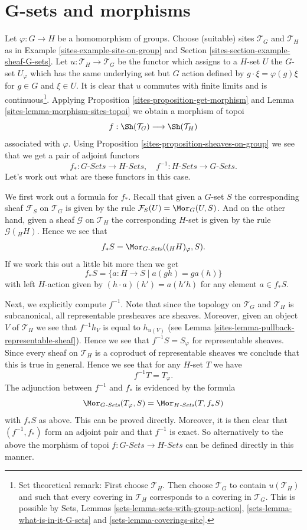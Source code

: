 \section{G-sets and morphisms}
\label{sites-section-G-sets-morphisms}
Let $\varphi : G \to H$ be a homomorphism of groups.
Choose (suitable) sites $\mathcal{T}_G$ and $\mathcal{T}_H$ as in
Example \ref{sites-example-site-on-group} and
Section \ref{sites-section-example-sheaf-G-sets}.
Let $u : \mathcal{T}_H \to \mathcal{T}_G$ be the functor which assigns
to a $H$-set $U$ the $G$-set $U_\varphi$ which has the same underlying
set but $G$ action defined by $g \cdot \xi = \varphi(g)\xi$ for
$g \in G$ and $\xi \in U$.
It is clear that $u$ commutes with finite limits and is
continuous\footnote{Set theoretical remark: First choose $\mathcal{T}_H$.
Then choose $\mathcal{T}_G$ to contain $u(\mathcal{T}_H)$ and such that
every covering in $\mathcal{T}_H$ corresponds to a covering in
$\mathcal{T}_G$. This is possible by
Sets, Lemmas
\ref{sets-lemma-sets-with-group-action},
\ref{sets-lemma-what-is-in-it-G-sets} and
\ref{sets-lemma-coverings-site}.}.
Applying
Proposition \ref{sites-proposition-get-morphism}
and
Lemma \ref{sites-lemma-morphism-sites-topoi}
we obtain a morphism of topoi
$$
f : \Sh(\mathcal{T}_G) \longrightarrow \Sh(\mathcal{T}_H)
$$
associated with $\varphi$. Using
Proposition \ref{sites-proposition-sheaves-on-group}
we see that we get a pair of adjoint functors
$$
f_* : G\textit{-Sets} \longrightarrow H\textit{-Sets}, \quad
f^{-1} : H\textit{-Sets} \longrightarrow G\textit{-Sets}.
$$
Let's work out what are these functors in this case.

\medskip\noindent
We first work out a formula for $f_*$.
Recall that given a $G$-set $S$ the corresponding sheaf
$\mathcal{F}_S$ on $\mathcal{T}_G$ is given by the rule
$\mathcal{F}_S(U) = \Mor_G(U, S)$. And on the other hand, given
a sheaf $\mathcal{G}$ on $\mathcal{T}_H$ the corresponding $H$-set
is given by the rule $\mathcal{G}({}_HH)$. Hence we see that
$$
f_*S = \Mor_{G\textit{-Sets}}(({}_HH)_\varphi, S).
$$
If we work this out a little bit more then we get
$$
f_*S = \{ a : H \to S \mid a(gh) = ga(h) \}
$$
with left $H$-action given by
$(h \cdot a)(h') = a(h'h)$
for any element $a \in f_*S$.

\medskip\noindent
Next, we explicitly compute $f^{-1}$. Note that since the topology
on $\mathcal{T}_G$ and $\mathcal{T}_H$ is subcanonical, all representable
presheaves are sheaves. Moreover, given an object $V$ of $\mathcal{T}_H$
we see that $f^{-1}h_V$ is equal to $h_{u(V)}$ (see
Lemma \ref{sites-lemma-pullback-representable-sheaf}). Hence we see that
$f^{-1}S = S_\varphi$ for representable sheaves. Since every sheaf on
$\mathcal{T}_H$ is a coproduct of representable sheaves we conclude that
this is true in general. Hence we see that
for any $H$-set $T$ we have
$$
f^{-1}T = T_\varphi.
$$
The adjunction between $f^{-1}$ and $f_*$ is evidenced by the formula
$$
\Mor_{G\textit{-Sets}}(T_\varphi, S) =
\Mor_{H\textit{-Sets}}(T, f_*S)
$$
with $f_*S$ as above. This can be proved directly. Moreover, it is then clear
that $(f^{-1}, f_*)$ form an adjoint pair and that $f^{-1}$ is exact.
So alternatively to the above the morphism of topoi
$f : G\textit{-Sets} \to H\textit{-Sets}$ can be defined directly in this
manner.

